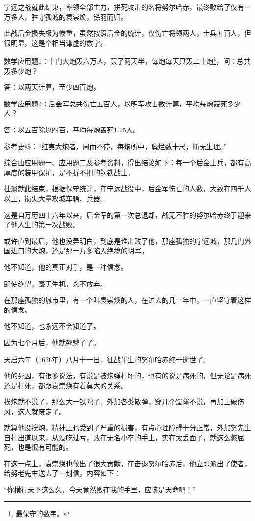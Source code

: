 \begin{multicols}{\theparacolNo}
		宁远之战就此结束，率领全部主力，拼死攻击的名将努尔哈赤，最终败给了仅有一万多人，驻守孤城的袁崇焕，铩羽而归。

		此战后金损失极为惨重，虽然按照后金的统计，仅伤亡将领两人，士兵五百人，但很明显，这是个相当谦虚的数字。

		数学应用题1：十门大炮轰六万人，轰了两天半，每炮每天只轰二十炮\footnote{最保守的数字。}，问：总共轰多少炮？

		答：以两天计算，至少四百炮。

		数学应用题2：后金军总共伤亡五百人，以明军攻击数计算，平均每炮轰死多少人？

		答：以五百除以四百，平均每炮轰死1.25人。

		参考史料：“红夷大炮者，周而不停，每炮所中，糜烂数十尺，断无生理。”

		综合由应用题一、应用题二及参考资料，得出结论如下：每一个后金士兵，都有高厚度的装甲保护，是不折不扣的钢铁战士。

		扯淡就此结束，根据保守统计，在宁远战役中，后金军伤亡的人数，大致在四千人以上，损失大量攻城车辆、兵器。

		这是自万历四十六年以来，后金军的第一次总退却，战无不胜的努尔哈赤终于迎来了他人生的第一次战败。

		或许直到最后，他也没弄明白，到底是谁击败了他，那座孤独的宁远城，那几门外国进口的大炮，还是那一万多陷入绝境的明军。

		他不知道，他的真正对手，是一种信念。

		即使绝望，毫无生机，永不放弃。

		在那座孤独的城市里，有一个叫袁崇焕的人，在过去的几十年中，一直坚守着这样的信念。

		他不知道，也永远不会知道了。

		因为七个月后，他就翘辫子了。

		天启六年（1626年）八月十一日，征战半生的努尔哈赤终于逝世了。

		他的死因，有很多说法，有说是被炮弹打坏的，也有的说是病死的，但无论是病死还是打死，都跟袁崇焕有着莫大的关系。

		挨炮就不说了，那么大一铁陀子，外加各类散弹，穿几个窟窿不说，再加上破伤风，这人就废定了。

		就算他没挨炮，精神上也受到了严重的损害，有点心理障碍十分正常，外加努先生自打出道以来，从没吃过亏，败在无名小卒的手上，实在太丢面子，就这么憋屈死，也是很有可能的。

		在这一点上，袁崇焕也做出了很大贡献，在击退努尔哈赤后，他立即派出了使者，给努老先生送去了一封信，内容如下：

		“你横行天下这么久，今天竟然败在我的手里，应该是天命吧！”


\end{multicols}
